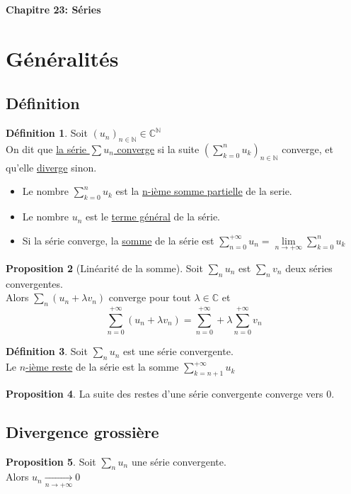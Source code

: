 \documentclass[10pt,a4paper]{article}
\theoremstyle{definition}
\newtheorem{proposition}{Proposition}[section]
\newtheorem{definition}[proposition]{Définition}
\begin{document}
\renewcommand{\labelitemi}{$*$}
\begin{center}
{\Large \textbf{Chapitre 23: Séries}}
\end{center}

\section{Généralités}
\subsection{Définition}
\begin{definition}
Soit $(u_n)_{n \in \mathbb{N}} \in \mathbb{C}^{\mathbb{N}}$ \\
On dit que \uline{la série $\sum u_n$ converge} si la suite $\left( \sum\limits_{k = 0}^n u_k \right)_{n \in \mathbb{N}}$ converge, et qu'elle \uline{diverge} sinon.
\begin{itemize}
\item Le nombre $\sum\limits_{k = 0}^n u_k$ est la \uline{n-ième somme partielle} de la serie.
\item Le nombre $u_n$ est le \uline{terme général} de la série.
\item Si la série converge, la \uline{somme} de la série est $\sum\limits_{n = 0}^{+\infty} u_n = \lim\limits_{n \to +\infty} \sum\limits_{k = 0}^{n} u_k$
\end{itemize}
\end{definition}
\begin{proposition}[Linéarité de la somme]
Soit $\sum\limits_n u_n$ est $\sum\limits_n v_n$ deux séries convergentes. \\
Alors $\sum\limits_n (u_n + \lambda v_n)$ converge pour tout $\lambda \in \mathbb{C}$ et
\[\sum\limits_{n = 0}^{+\infty} (u_n + \lambda v_n) = \sum\limits_{n = 0}^{+\infty} + \lambda \sum\limits_{n = 0}^{+\infty} v_n\]
\end{proposition}
\begin{definition}
Soit $\sum\limits_n u_n$ est une série convergente. \\
Le \uline{$n$-ième reste} de la série est la somme $\sum\limits_{k = n + 1}^{+\infty} u_k$
\end{definition}
\begin{proposition}
La suite des restes d'une série convergente converge vers $0$.
\end{proposition}

\subsection{Divergence grossière}
\begin{proposition}
Soit $\sum\limits_n u_n$ une série convergente. \\
Alors $u_n \xrightarrow[n \to +\infty]{} 0$
\end{proposition}
\end{document}
